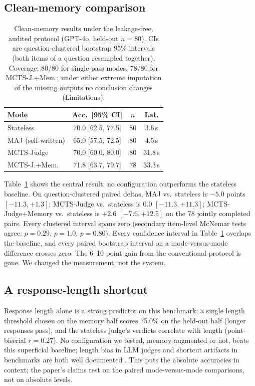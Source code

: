 \documentclass[]{ceurart}
\begin{document}
\subsection{Clean-memory comparison}

\begin{table}[t]
\centering
\small
\caption{Clean-memory results under the leakage-free, audited protocol (GPT-4o, held-out $n{=}80$). CIs are question-clustered bootstrap 95\% intervals (both items of a question resampled together). Coverage: 80/80 for single-pass modes, 78/80 for MCTS-J.+Mem.; under either extreme imputation of the missing outputs no conclusion changes (Limitations).}
\label{tab:clean}
\begin{tabular}{lccc}
\toprule
Mode & Acc.\ [95\% CI] & $n$ & Lat. \\
\midrule
Stateless & 70.0 [62.5, 77.5] & 80 & 3.6\,s \\
MAJ (self-written) & 65.0 [57.5, 72.5] & 80 & 4.5\,s \\
MCTS-Judge & 70.0 [60.0, 80.0] & 80 & 31.8\,s \\
MCTS-J.+Mem. & 71.8 [63.7, 79.7] & 78 & 33.3\,s \\
\bottomrule
\end{tabular}

\end{table}

Table~\ref{tab:clean} shows the central result: no configuration outperforms the stateless baseline. On question-clustered paired deltas, MAJ vs.\ stateless is $-5.0$ points $[-11.3, +1.3]$; MCTS-Judge vs.\ stateless is $0.0$ $[-11.3, +11.3]$; MCTS-Judge+Memory vs.\ stateless is $+2.6$ $[-7.6, +12.5]$ on the 78 jointly completed pairs. Every clustered interval spans zero (secondary item-level McNemar tests agree: $p{=}0.29$, $p{=}1.0$, $p{=}0.80$). Every confidence interval in Table~\ref{tab:clean} overlaps the baseline, and every paired bootstrap interval on a mode-versus-mode difference crosses zero. The 6--10 point gain from the conventional protocol is gone. We changed the measurement, not the system.

\subsection{A response-length shortcut}
\label{sec:length}

Response length alone is a strong predictor on this benchmark: a single length threshold chosen on the memory half scores 75.0\% on the held-out half (longer responses pass), and the stateless judge's verdicts correlate with length (point-biserial $r{=}0.27$). No configuration we tested, memory-augmented or not, beats this superficial baseline; length bias in LLM judges and shortcut artifacts in benchmarks are both well documented \citep{dubois2024length, gururangan2018annotation}. This puts the absolute accuracies in context; the paper's claims rest on the paired mode-versus-mode comparisons, not on absolute levels.
\end{document}
